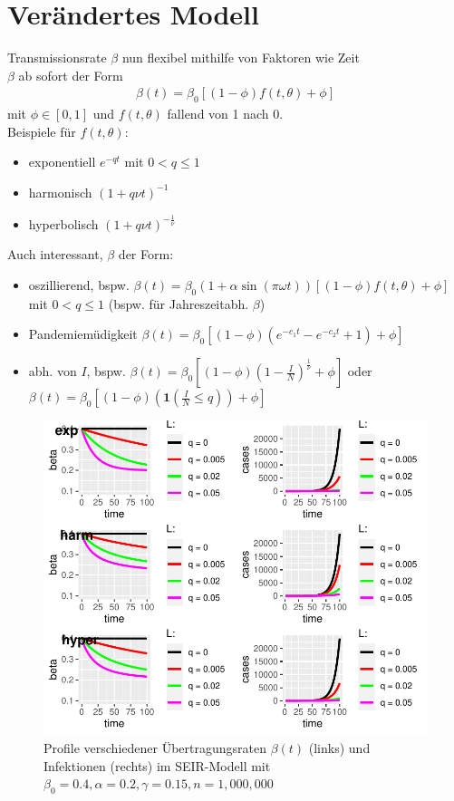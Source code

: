 \documentclass{scrartcl}
\begin{document}
\section{Verändertes Modell}
Transmissionsrate $\beta$ nun flexibel mithilfe von Faktoren wie Zeit \\
$\beta$ ab sofort der Form \begin{align*}
\beta(t) = \beta_0 [(1-\phi)f(t, \theta) + \phi]
\end{align*}
mit $\phi \in [0,1]$ und $f(t, \theta)$ fallend von 1 nach 0. \\
Beispiele für $f(t, \theta)$: \begin{itemize}
\item exponentiell $e^{-qt}$ mit $0 < q \leq 1$
\item harmonisch $(1+q\nu t)^{-1}$
\item hyperbolisch $(1+q\nu t)^{-\frac{1}{\nu}}$
\end{itemize}
\newpage
Auch interessant, $\beta$ der Form: \begin{itemize}
\item oszillierend, bspw. $\beta(t) = \beta_0(1+\alpha\sin(\pi\omega t))[(1-\phi)f(t,\theta)+\phi]$ mit $0 < q \leq 1$ (bspw. für Jahreszeitabh. $\beta$)
\item Pandemiemüdigkeit $\beta(t) = \beta_0[(1-\phi)(e^{-c_1 t} - e^{-c_2 t}+1)+\phi]$
\item abh. von $I$, bspw.  $\beta(t) = \beta_0[(1-\phi)(1-\frac{I}{N})^{\frac{1}{\nu}}+\phi]$ oder $\beta(t) = \beta_0[(1-\phi)(\mathbf{1}(\frac{I}{N}\leq q))+\phi]$ 
\end{itemize}
\vspace{0.5cm}

\begin{figure}[ht]
	\centering
  \includegraphics{beta_plot}
	\caption{Profile verschiedener Übertragungsraten $\beta(t)$ (links) und Infektionen (rechts) im SEIR-Modell mit $\beta_0 = 0.4, \alpha = 0.2, \gamma = 0.15, n = 1,000,000$}
	\label{fig2}
\end{figure}
\end{document}

